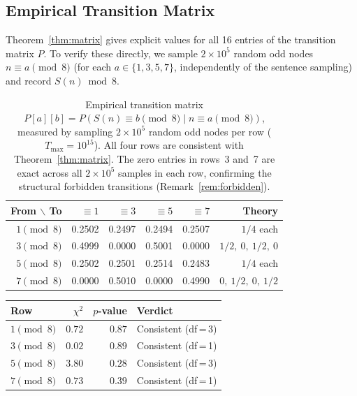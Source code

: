 \documentclass[12pt]{article}
\theoremstyle{definition}
\theoremstyle{remark}
\newcommand{\Sm}{S}
\begin{document}
\subsection*{Empirical Transition Matrix}

Theorem~\ref{thm:matrix} gives explicit values for all 16 entries of the
transition matrix $P$.
To verify these directly, we sample $2 \times 10^5$ random odd nodes
$n \equiv a \pmod 8$ (for each $a \in \{1,3,5,7\}$, independently of the
sentence sampling) and record $\Sm(n) \bmod 8$.

\begin{table}[h]
\centering
\begin{tabular}{rrrrrr}
\toprule
From $\backslash$ To & $\equiv 1$ & $\equiv 3$ & $\equiv 5$ & $\equiv 7$ & Theory \\
\midrule
$1 \pmod 8$ & 0.2502 & 0.2497 & 0.2494 & 0.2507 & $1/4$ each \\
$3 \pmod 8$ & 0.4999 & 0.0000 & 0.5001 & 0.0000 & $1/2,\ 0,\ 1/2,\ 0$ \\
$5 \pmod 8$ & 0.2502 & 0.2501 & 0.2514 & 0.2483 & $1/4$ each \\
$7 \pmod 8$ & 0.0000 & 0.5010 & 0.0000 & 0.4990 & $0,\ 1/2,\ 0,\ 1/2$ \\
\bottomrule
\end{tabular}
\caption{Empirical transition matrix $P[a][b] = P(\Sm(n) \equiv b \pmod 8 \mid n \equiv a \pmod 8)$,
measured by sampling $2 \times 10^5$ random odd nodes per row ($T_{\max} = 10^{15}$).
All four rows are consistent with Theorem~\ref{thm:matrix}.
The zero entries in rows~3 and~7 are exact across all $2 \times 10^5$ samples
in each row, confirming the structural forbidden transitions
(Remark~\ref{rem:forbidden}).}
\label{tab:matrix}
\end{table}

\begin{center}
\begin{tabular}{lrrl}
\toprule
Row & $\chi^2$ & $p$-value & Verdict \\
\midrule
$1 \pmod 8$ & $0.72$ & $0.87$ & Consistent (df\,=\,3) \\
$3 \pmod 8$ & $0.02$ & $0.89$ & Consistent (df\,=\,1) \\
$5 \pmod 8$ & $3.80$ & $0.28$ & Consistent (df\,=\,3) \\
$7 \pmod 8$ & $0.73$ & $0.39$ & Consistent (df\,=\,1) \\
\bottomrule
\end{tabular}
\end{center}
\end{document}
